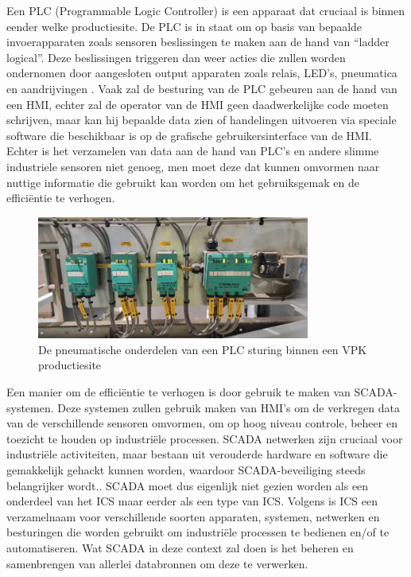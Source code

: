 Een PLC (Programmable Logic Controller) is een apparaat dat cruciaal is binnen eender welke productiesite. De PLC is in staat om op basis van bepaalde invoerapparaten zoals sensoren beslissingen te maken aan de hand van “ladder logical”. Deze beslissingen triggeren dan weer acties die zullen worden ondernomen door aangesloten output apparaten zoals relais, LED’s, pneumatica en aandrijvingen \autocite{unitronics2025}.
Vaak zal de besturing van de PLC gebeuren aan de hand van een HMI, echter zal de operator van de HMI geen daadwerkelijke code moeten schrijven, maar kan hij bepaalde data zien of handelingen uitvoeren via speciale software die beschikbaar is op de grafische gebruikersinterface van de HMI. 
Echter is het verzamelen van data aan de hand van PLC’s en andere slimme industriele sensoren niet genoeg, men moet deze dat kunnen omvormen naar nuttige informatie die gebruikt kan worden om het gebruiksgemak en de efficiëntie te verhogen. 

\begin{figure}[H]
    \centering
    \includegraphics[width=0.8\textwidth]{fotos/PLC_pneumatica.jpg}
    \caption[Pneumatica PLC]{\label{fig:grail}De pneumatische onderdelen van een PLC sturing binnen een VPK productiesite}
\end{figure} 

Een manier om de efficiëntie te verhogen is door gebruik te maken van SCADA-systemen. 
Deze systemen zullen gebruik maken van HMI’s om de verkregen data van de verschillende sensoren omvormen, om op hoog niveau controle, beheer en toezicht te houden op industriële processen. SCADA netwerken zijn cruciaal voor industriële activiteiten, maar bestaan uit verouderde hardware en software die gemakkelijk gehackt kunnen worden, waardoor SCADA-beveiliging steeds belangrijker wordt.\autocite{FortinetSC2025}. SCADA moet dus eigenlijk niet gezien worden als een onderdeel van het ICS maar eerder als een type van ICS. 
Volgens \textcite{Mhaskar2021} is ICS een verzamelnaam voor verschillende soorten apparaten, systemen, netwerken en besturingen die worden gebruikt om industriële processen te bedienen en/of te automatiseren. Wat SCADA in deze context zal doen is het beheren en samenbrengen van allerlei databronnen om deze te verwerken.


